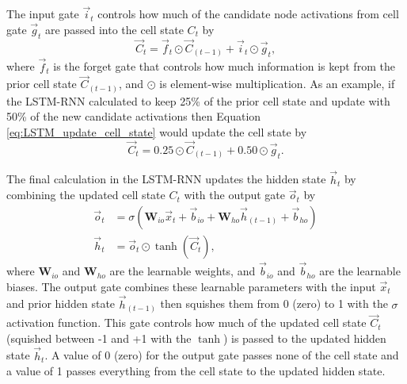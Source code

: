 The input gate $\vec{i}_{t}$ controls how much of the candidate node activations from cell gate $\vec{g}_{t}$ are passed into the cell state $C_{t}$ by
\begin{equation} \label{eq:LSTM_update_cell_state}
	\vec{C}_{t} = \vec{f}_{t} \odot \vec{C}_{\left(t-1\right)} + \vec{i}_{t} \odot \vec{g}_{t},
\end{equation}
where $\vec{f}_{t}$ is the forget gate that controls how much information is kept from the prior cell state $\vec{C}_{\left(t-1\right)}$, and $\odot$ is element-wise multiplication. As an example, if the \ac{LSTM-RNN} calculated to keep 25\% of the prior cell state and update with 50\% of the new candidate activations then Equation \ref{eq:LSTM_update_cell_state} would update the cell state by
\[
\vec{C}_{t} = 0.25 \odot \vec{C}_{\left(t-1\right)} + 0.50 \odot \vec{g}_{t}.
\]

The final calculation in the \ac{LSTM-RNN} updates the hidden state $\vec{h}_{t}$ by combining the updated cell state $C_{t}$ with the output gate $\vec{o}_{t}$ by
\begin{align}
\vec{o}_{t} &= \sigma\left(\textbf{W}_{io} \vec{x}_{t} + \vec{b}_{io} + \textbf{W}_{ho} \vec{h}_{\left(t-1\right)} + \vec{b}_{ho}\right) \label{eq:LSTM_output_gate} \\
\vec{h}_{t} &= \vec{o}_{t} \odot \tanh\left(\vec{C}_{t}\right), \label{eq:LSTM_updated_hidden_state}
\end{align}
where $\textbf{W}_{io}$ and $\textbf{W}_{ho}$ are the learnable weights, and $\vec{b}_{io}$ and $\vec{b}_{ho}$ are the learnable biases. The output gate combines these learnable parameters with the input $\vec{x}_{t}$ and prior hidden state $\vec{h}_{\left(t-1\right)}$ then squishes them from 0 (zero) to 1 with the $\sigma$ activation function. This gate controls how much of the updated cell state $\vec{C}_{t}$ (squished between -1 and +1 with the $\tanh$) is passed to the updated hidden state $\vec{h}_{t}$. A value of 0 (zero) for the output gate passes none of the cell state and a value of 1 passes everything from the cell state to the updated hidden state.

